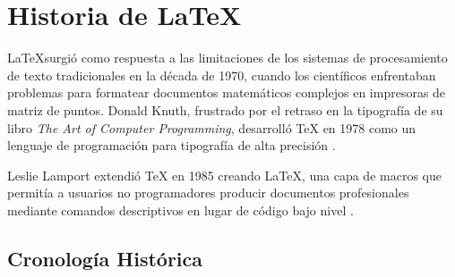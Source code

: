 \section{Historia de \LaTeX}
\LaTeX surgió como respuesta a las limitaciones de los sistemas de procesamiento de texto tradicionales en la década de 1970, cuando los científicos enfrentaban problemas para formatear documentos matemáticos complejos en impresoras de matriz de puntos. Donald Knuth, frustrado por el retraso en la tipografía de su libro \emph{The Art of Computer Programming}, desarrolló TeX en 1978 como un lenguaje de programación para tipografía de alta precisión \cite{knuth_texbook}.

Leslie Lamport extendió TeX en 1985 creando \LaTeX, una capa de macros que permitía a usuarios no programadores producir documentos profesionales mediante comandos descriptivos en lugar de código bajo nivel \cite{lamport_latex}.

\subsection{Cronología Histórica}

\begin{table}[h]
    \centering
    \caption{Cronología clave en el desarrollo de \LaTeX \cite{latex_project}}

\label{tab:cronologia}
\end{table}

